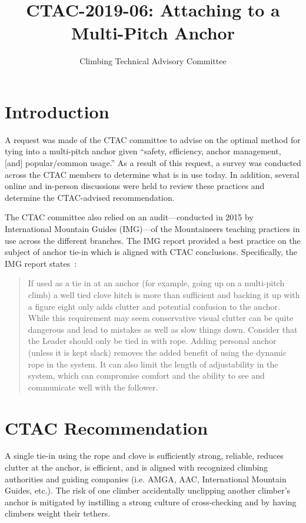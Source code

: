 \documentclass[nonacm,acmtog,authordraft]{acmart}
\title{CTAC-2019-06: Attaching to a Multi-Pitch Anchor}
\subtitle{Climbing Technical Advisory Committee}
\begin{document}
\maketitle

\section{Introduction}
  A request was made of the CTAC committee to advise on the optimal method for
  tying into a multi-pitch anchor given “safety, efficiency, anchor management,
  [and] popular/common usage.” As a result of this request, a survey was
  conducted across the CTAC members to determine what is in use today. In
  addition, several online and in-person discussions were held to review these
  practices and determine the CTAC-advised recommendation.

  The CTAC committee also relied on an audit---conducted in 2015 by
  International Mountain Guides (IMG)---of the Mountaineers teaching practices
  in use across the different branches. The IMG report provided a best practice
  on the subject of anchor tie-in which is aligned with CTAC conclusions.
  Specifically, the IMG report states~\cite{ref:imga-course-review}:

\begin{quote}
  If used as a tie in at an anchor (for example, going up on a multi-pitch
  climb) a well tied clove hitch is more than sufficient and backing it up with
  a figure eight only adds clutter and potential confusion to the anchor. While
  this requirement may seem conservative visual clutter can be quite dangerous
  and lead to mistakes as well as slow things down. Consider that the Leader
  should only be tied in with rope. Adding personal anchor (unless it is kept
  slack) removes the added benefit of using the dynamic rope in the system. It
  can also limit the length of adjustability in the system, which can
  compromise comfort and the ability to see and communicate well with the
  follower.
\end{quote}

\section{CTAC Recommendation}
A single tie-in using the rope and clove  is sufficiently strong, reliable,
reduces clutter at the anchor, is efficient, and is aligned with recognized
climbing authorities and guiding companies (i.e. AMGA, AAC, International
Mountain Guides, etc.).  The risk of one climber accidentally unclipping
another climber's anchor is mitigated by instilling a strong culture of
cross-checking and by having climbers weight their tethers.
\end{document}
